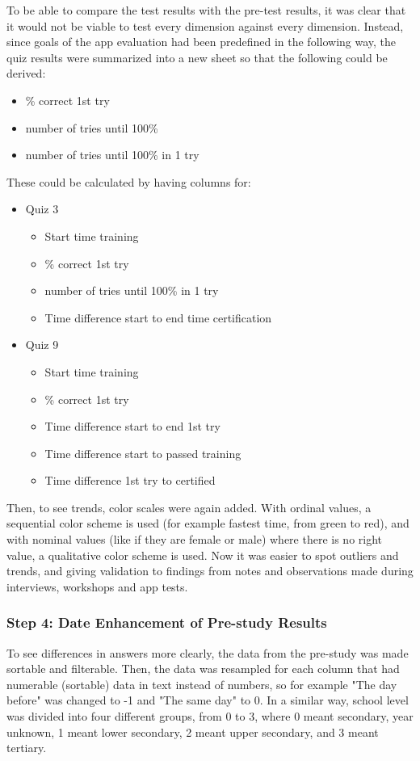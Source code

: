 To be able to compare the test results with the pre-test results, it was clear that it would not be viable to test every dimension against every dimension. Instead, since goals of the app evaluation had been predefined in the following way, the quiz results were summarized into a new sheet so that the following could be derived:

\begin{itemize}
\item \% correct 1st try
\item number of tries until 100\%
\item number of tries until 100\% in 1 try
\end{itemize}

These could be calculated by having columns for:

\begin{itemize}
  \item Quiz 3
  \begin{itemize}
    \item Start time training
    \item \% correct 1st try
    \item number of tries until 100\% in 1 try
    \item Time difference start to end time certification
  \end{itemize}
  \item Quiz 9
  \begin{itemize}
    \item Start time training
    \item \% correct 1st try
    \item Time difference start to end 1st try
    \item Time difference start to passed training
    \item Time difference 1st try to certified
  \end{itemize}
\end{itemize}

Then, to see trends, color scales were again added. With ordinal values, a sequential color scheme is used (for example fastest time, from green to red), and with nominal values (like if they are female or male) where there is no right value, a qualitative color scheme is used. Now it was easier to spot outliers and trends, and giving validation to findings from notes and observations made during interviews, workshops and app tests.

\subsubsection{Step 4: Date Enhancement of Pre-study Results}
To see differences in answers more clearly, the data from the pre-study was made sortable and filterable. Then, the data was resampled for each column that had numerable (sortable) data in text instead of numbers, so for example "The day before" was changed to -1 and "The same day" to 0. In a similar way, school level was divided into four different groups, from 0 to 3, where 0 meant secondary, year unknown, 1 meant lower secondary, 2 meant upper secondary, and 3 meant tertiary.

